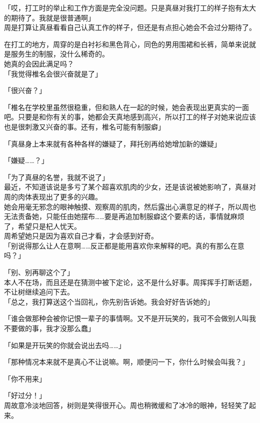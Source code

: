 「哎，打工时的举止和工作方面是完全没问题。只是真昼对我打工的样子抱有太大的期待了。我就是很普通啊」\\

周是打算让真昼看看自己认真工作的样子，但还是有点担心她会不会过分期待了。

在打工的地方，周穿的是白衬衫和黑色背心，同色的男用围裙和长裤，简单来说就是服务生的制服，没什么稀奇的。\\

她真的会因此满足吗？\\

「我觉得椎名会很兴奋就是了」

「很兴奋？」

「椎名在学校里虽然很稳重，但和熟人在一起的时候，她会表现出更真实的一面吧。只要是和你有关的事，她都会天真地感到高兴，所以打工的样子对她来说应该也是很刺激又兴奋的事。还有，椎名可能有制服癖」

「真昼身上本来就有各种各样的嫌疑了，拜托别再给她增加新的嫌疑」

「嫌疑……？」

「为了真昼的名誉，我就不说了」\\

最近，不知道该说是多亏了某个超喜欢肌肉的少女，还是该说被她影响了，真昼对周的肉体表现出了更多的兴趣。\\

她会用毫无邪念的眼神触摸、观察周的肌肉，然后露出心满意足的样子，所以周也无法责备她，只能任由她摆布……要是再追加制服癖这个要素的话，事情就麻烦了，希望只是杞人忧天。\\

周希望她只是因为喜欢自己才看，才会感到好奇。\\

「别说得那么让人在意啊……反正都是能用喜欢你来解释的吧。真的有那么在意吗？」

「别、别再聊这个了」\\

本人不在场，而且还是在猜测中被下定论，这不是什么好事。周挥挥手打断话题，不让树继续追问下去。\\

「总之，我打算送这个当回礼，你先别告诉她。我会好好告诉她的」

「谁会做那种会被你记恨一辈子的事情啊。又不是开玩笑的，我可不会做别人叫我不要做的事，我才没那么蠢」

「如果是开玩笑的你就会说出去吗……」

「那种情况本来就不是真心不让说嘛。啊，顺便问一下，你什么时候会叫我？」

「你不用来」

「好过分！」\\

周故意冷淡地回答，树则是笑得很开心。周也稍微缓和了冰冷的眼神，轻轻笑了起来。

